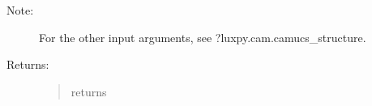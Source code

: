 \documentclass[letterpaper,10pt,english]{sphinxmanual}
\begin{document}
\begin{fulllineitems}
\begin{description}
\begin{quote}
\begin{description}
\end{description}\end{quote}

\item[{Note:}] \leavevmode
For the other input arguments, see ?luxpy.cam.camucs\_structure.

\item[{Returns:}] \leavevmode\begin{quote}\begin{description}
\item[{returns}] \leavevmode
{}

\end{description}\end{quote}

\end{description}

\end{fulllineitems}

\end{document}
